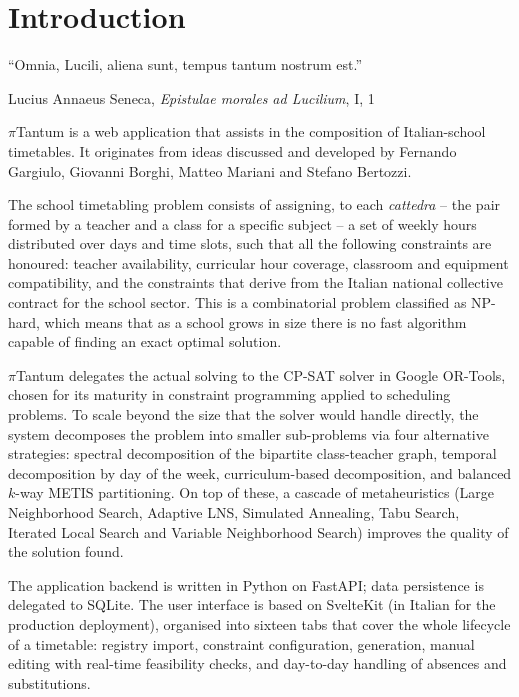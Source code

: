 \chapter*{Introduction}
\label{ch:prologo}

\epigraph{``Omnia, Lucili, aliena sunt, tempus tantum nostrum
est.''}{Lucius Annaeus Seneca, \emph{Epistulae morales ad
Lucilium}, I, 1}

$\pi$Tantum is a web application that assists in the
composition of Italian-school timetables. It originates from
ideas discussed and developed by Fernando Gargiulo, Giovanni
Borghi, Matteo Mariani and Stefano Bertozzi.

The school timetabling problem consists of assigning, to each
\emph{cattedra} -- the pair formed by a teacher and a class for
a specific subject -- a set of weekly hours distributed over
days and time slots, such that all the following constraints
are honoured: teacher availability, curricular hour coverage,
classroom and equipment compatibility, and the constraints that
derive from the Italian national collective contract for the
school sector. This is a combinatorial problem classified as
NP-hard, which means that as a school grows in size there is no
fast algorithm capable of finding an exact optimal solution.

$\pi$Tantum delegates the actual solving to the CP-SAT solver in
Google OR-Tools, chosen for its maturity in constraint
programming applied to scheduling problems. To scale beyond the
size that the solver would handle directly, the system
decomposes the problem into smaller sub-problems via four
alternative strategies: spectral decomposition of the bipartite
class-teacher graph, temporal decomposition by day of the week,
curriculum-based decomposition, and balanced $k$-way METIS
partitioning. On top of these, a cascade of metaheuristics
(Large Neighborhood Search, Adaptive LNS, Simulated Annealing,
Tabu Search, Iterated Local Search and Variable Neighborhood
Search) improves the quality of the solution found.

The application backend is written in Python on FastAPI; data
persistence is delegated to SQLite. The user interface is
based on SvelteKit (in Italian for the production deployment),
organised into sixteen tabs that cover the whole lifecycle of a
timetable: registry import, constraint configuration, generation,
manual editing with real-time feasibility checks, and
day-to-day handling of absences and substitutions.

